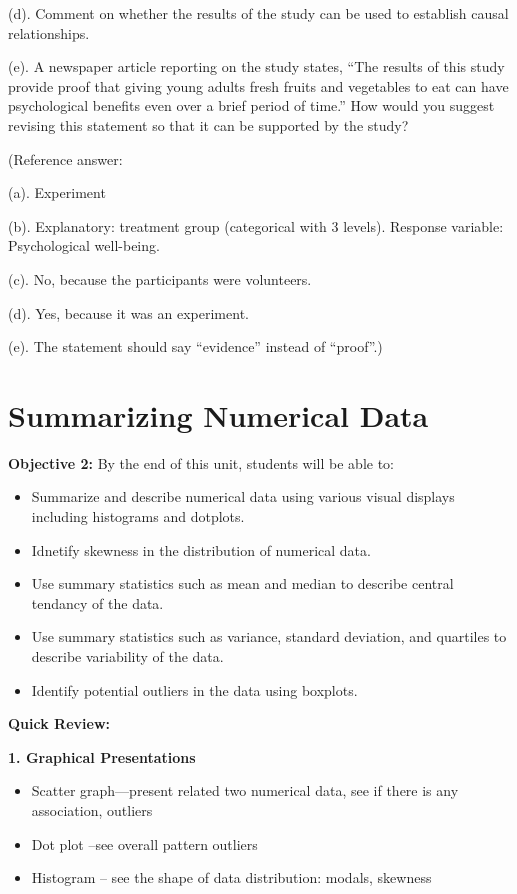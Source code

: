 \documentclass[
]{book}
\providecommand{\tightlist}{%
  \setlength{\itemsep}{0pt}\setlength{\parskip}{0pt}}
\begin{document}
(d). Comment on whether the results of the study can be used to establish causal relationships.

(e). A newspaper article reporting on the study states, ``The results of this study provide proof that giving young adults fresh fruits and vegetables to eat can have psychological benefits even over a brief period of time.'' How would you suggest revising this statement so that it can be supported by the study?

(Reference answer:

(a). Experiment

(b). Explanatory: treatment group (categorical with 3 levels). Response variable: Psychological well-being.

(c). No, because the participants were volunteers.

(d). Yes, because it was an experiment.

(e). The statement should say ``evidence'' instead of ``proof''.)

\newpage

\section{Summarizing Numerical Data}\label{summarizing-numerical-data}

\textbf{Objective 2:} By the end of this unit, students will be able to:

\begin{itemize}
\tightlist
\item
  Summarize and describe numerical data using various visual displays including histograms and dotplots.
\item
  Idnetify skewness in the distribution of numerical data.
\item
  Use summary statistics such as mean and median to describe central tendancy of the data.
\item
  Use summary statistics such as variance, standard deviation, and quartiles to describe variability of the data.
\item
  Identify potential outliers in the data using boxplots.
\end{itemize}

\textbf{Quick Review:}

\textbf{1. Graphical Presentations}

\begin{itemize}
\tightlist
\item
  Scatter graph---present related two numerical data, see if there is any association, outliers
\item
  Dot plot --see overall pattern outliers
\item
  Histogram -- see the shape of data distribution: modals, skewness
\end{itemize}
\end{document}
